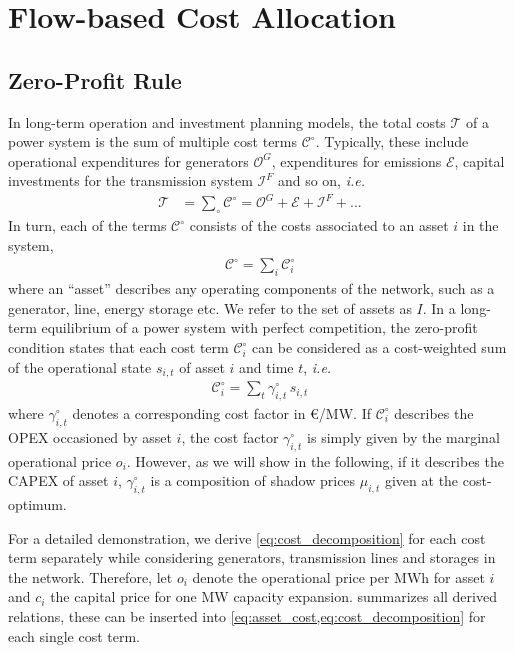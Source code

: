 \documentclass[11pt,twocolumn]{article}
\newcommand{\ie}{\textit{i.e.} }
\newcommand{\state}[1][i]{s_{#1,t}}
\newcommand{\costfactor}{\gamma^\circ_{i,t}}
\newcommand{\totalcost}{\mathcal{T}}
\newcommand{\cost}[1][\circ]{\mathcal{C}^{#1}}
\newcommand{\opexgeneration}{\mathcal{O}^G}
\newcommand{\capexflow}{\mathcal{I}^F}
\newcommand{\emissioncost}{\mathcal{E}}
\begin{document}
\section{Flow-based Cost Allocation}

\subsection{Zero-Profit Rule}

In long-term operation and investment planning models, the total costs $\totalcost$ of a power system is the sum of multiple cost terms $\cost$. Typically, these include operational expenditures for generators $\opexgeneration$, expenditures for emissions $\emissioncost$,  capital investments for the transmission system $\capexflow$ and so on, \ie
\begin{align}
\totalcost &= \sum_\circ \cost = \opexgeneration + \emissioncost +  \capexflow + ...
\label{eq:total_cost}
\end{align}
In turn, each of the terms $\cost$ consists of the costs associated to an asset $i$ in the system, 
\begin{align}
    \cost = \sum_{i} \cost_{i}
    \label{eq:asset_cost}
\end{align} 
where an ``asset'' describes any operating components of the network, such as a generator, line, energy storage etc. We refer to the set of assets as $I$. 
In a long-term equilibrium of a power system with perfect competition, the zero-profit condition states that each cost term $\cost_{i}$ can be considered as a cost-weighted sum of the operational state $s_{i,t}$ of asset $i$ and time $t$, \ie
\begin{align}
    \cost_{i} = \sum_t  \costfactor \, \state
    \label{eq:cost_decomposition}
\end{align}
where $\costfactor$ denotes a corresponding cost factor in \euro/MW. 
If $\cost_i$ describes the OPEX occasioned by asset $i$, the cost factor $\costfactor$ is simply given by the marginal operational price $o_i$. However, as we will show in the following, if it describes the CAPEX of asset $i$, $\costfactor$ is a composition of shadow prices $\mu_{i,t}$ given at the cost-optimum. 

For a detailed demonstration, we derive  \cref{eq:cost_decomposition} for each cost term separately while considering generators, transmission lines and storages in the network. Therefore, let $o_i$ denote the operational price per MWh for asset $i$ and $c_i$ the capital price for one MW capacity expansion.  summarizes all derived relations, these can be inserted into \cref{eq:asset_cost,eq:cost_decomposition} for each single cost term.
\end{document}
